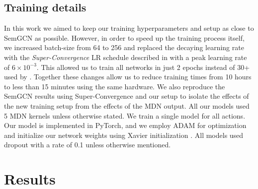 \subsection{Training details}

In this work we aimed to keep our training hyperparameters and setup as close to SemGCN as possible. However, in order to speed up the training process itself, we increased batch-size from 64 to 256 and replaced the decaying learning rate with the \textit{Super-Convergence} LR schedule described in \cite{smith2017superconvergence} with a peak learning rate of $6 \times 10^{-3}$. This allowed us to train all networks in just 2 epochs instead of 30+ used by \cite{Zhao_2019_CVPR}. Together these changes allow us to reduce training times from 10 hours to less than 15 minutes using the same hardware. We also reproduce the SemGCN results using Super-Convergence and our setup to isolate the effects of the new training setup from the effects of the MDN output. All our models used 5 MDN kernels unless otherwise stated. We train a single model for all actions. Our model is implemented in PyTorch, and we employ ADAM \cite{kingma2014adam} for optimization and initialize our network weights using Xavier initialization \cite{glorot2010understanding}. All models used dropout with a rate of 0.1 unless otherwise mentioned.

\section{Results}
\label{results}



